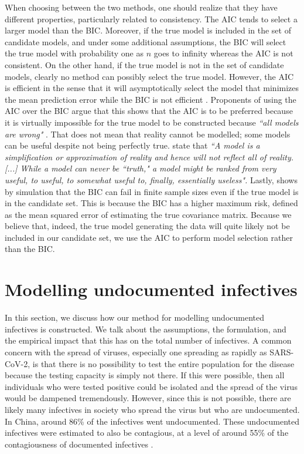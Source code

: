 \documentclass[12pt]{article}
\begin{document}
	When choosing between the two methods, one should realize that they have different properties, particularly related to consistency. The AIC tends to select a larger model than the BIC. Moreover, if the true model is included in the set of candidate models, and under some additional assumptions, the BIC will select the true model with probability one as $n$ goes to infinity whereas the AIC is not consistent. On the other hand, if the true model is not in the set of candidate models, clearly no method can possibly select the true model. However, the AIC is efficient in the sense that it will asymptotically select the model that minimizes the mean prediction error while the BIC is not efficient \parencite{vrieze2012model}. Proponents of using the AIC over the BIC argue that this shows that the AIC is to be preferred because it is virtually impossible for the true model to be constructed because \textit{``all models are wrong"} \parencite{box1976science}. That does not mean that reality cannot be modelled; some models can be useful despite not being perfectly true. \textcite{burnham2002practical} state that \textit{``A model is a simplification or approximation of reality and hence will not reflect all of reality. [...] While a model can never be ``truth," a model might be ranked from very useful, to useful, to somewhat useful to, finally, essentially useless".} Lastly, \textcite{vrieze2012model} shows by simulation that the BIC can fail in finite sample sizes even if the true model is in the candidate set. This is because the BIC has a higher maximum risk, defined as the mean squared error of estimating the true covariance matrix. Because we believe that, indeed, the true model generating the data will quite likely not be included in our candidate set, we use the AIC to perform model selection rather than the BIC.
	
	\section{Modelling undocumented infectives} \label{sec:undocumented_modelling}
	In this section, we discuss how our method for modelling undocumented infectives is constructed. We talk about the assumptions, the formulation, and the empirical impact that this has on the total number of infectives. A common concern with the spread of viruses, especially one spreading as rapidly as SARS-CoV-2, is that there is no possibility to test the entire population for the disease because the testing capacity is simply not there. If this were possible, then all individuals who were tested positive could be isolated and the spread of the virus would be dampened tremendously. However, since this is not possible, there are likely many infectives in society who spread the virus but who are undocumented. In China, around 86\% of the infectives went undocumented. These undocumented infectives were estimated to also be contagious, at a level of around 55\% of the contagiousness of documented infectives \parencite{li2020undocumented}. \\
	
\end{document}
